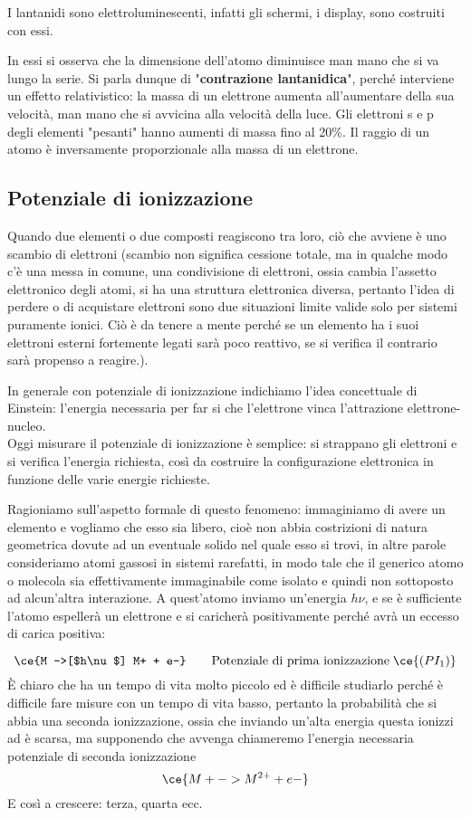 I lantanidi sono elettroluminescenti, infatti gli schermi, i display, sono costruiti con essi.

In essi si osserva che la dimensione dell'atomo diminuisce man mano che si va lungo la serie. Si parla dunque di "\textbf{contrazione lantanidica}", perché interviene un effetto relativistico: la massa di un elettrone aumenta all'aumentare della sua velocità, man mano che si avvicina alla velocità della luce. Gli elettroni s e p degli elementi "pesanti" hanno aumenti di massa fino al 20\%. Il raggio di un atomo è inversamente proporzionale alla massa di un elettrone.
\subsection{Potenziale di ionizzazione}
Quando due elementi o due composti reagiscono tra loro, ciò che avviene è uno scambio di elettroni (scambio non significa cessione totale, ma in qualche modo c'è una messa in comune, una condivisione di elettroni, ossia cambia l'assetto elettronico degli atomi, si ha una struttura elettronica diversa, pertanto l'idea di perdere o di acquistare elettroni sono due situazioni limite valide solo per sistemi puramente ionici. Ciò è da tenere a mente perché se un elemento ha i suoi elettroni esterni fortemente legati sarà poco reattivo, se si verifica il contrario sarà propenso a reagire.).

In generale con potenziale di ionizzazione indichiamo l'idea concettuale di Einstein: l'energia necessaria per far si che l'elettrone vinca l'attrazione elettrone-nucleo.\\

Oggi misurare il potenziale di ionizzazione è semplice: si strappano gli elettroni e si verifica l'energia richiesta, così da costruire la configurazione elettronica in funzione delle varie energie richieste.

Ragioniamo sull'aspetto formale di questo fenomeno: immaginiamo di avere un elemento e vogliamo che esso sia libero, cioè non abbia costrizioni di natura geometrica dovute ad un eventuale solido nel quale esso si trovi, in altre parole consideriamo atomi gassosi in sistemi rarefatti, in modo tale che il generico atomo o molecola sia effettivamente immaginabile come isolato e quindi non sottoposto ad alcun'altra interazione. A quest'atomo inviamo un'energia $h\nu$, e se è sufficiente l'atomo espellerà un elettrone e si caricherà positivamente perché avrà un eccesso di carica positiva:

$$\ce{M ->[$h\nu$] M+ + e-} \qquad \text{Potenziale di prima ionizzazione} \; \ce{(PI_1)}$$
È chiaro che  ha un tempo di vita molto piccolo ed è difficile studiarlo perché è difficile fare misure con un tempo di vita basso, pertanto la probabilità che si abbia una seconda ionizzazione, ossia che inviando un'alta energia questa ionizzi  ad  è scarsa, ma supponendo che avvenga chiameremo l'energia necessaria potenziale di seconda ionizzazione 
$$\ce{M+ -> M^{2+} + e-}$$
E così a crescere: terza, quarta ecc.

